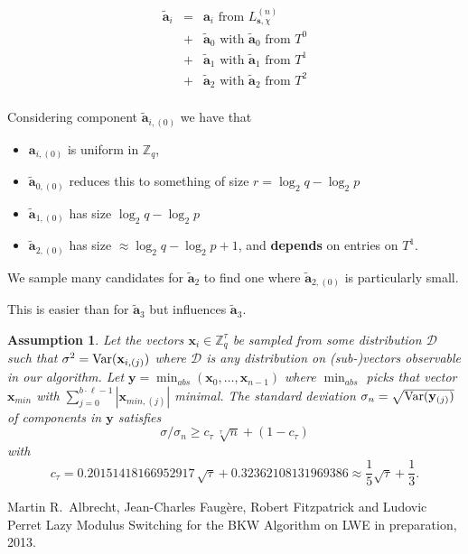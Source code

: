 \documentclass[10pt]{beamer}
\newcommand{\Var}{\ensuremath{\textnormal{Var}}}
\newcommand{\abs}[1]{\ensuremath{|#1|}\xspace}
\newcommand{\shortvec}[1]{\tilde{\mathbf{#1}}\xspace}
\renewcommand{\vec}[1]{\mathbf{#1}\xspace}
\newcommand{\Z}{\ensuremath{\mathbb{Z}}\xspace}
\newcommand{\Zq}{\ensuremath{\Z_q}\xspace}
\newcommand{\Ldis}{L_{\mathbf{s},\chi}^{(n)}\xspace}
\newtheorem{assumption}{Assumption}
\begin{document}
\begin{frame}
\begin{eqnarray*}
  \shortvec{a}_i &=& \vec{a}_i \mbox{ from } \Ldis\\
                 &+& \shortvec{a}_0 \mbox{ with } \shortvec{a}_0 \mbox{ from } T^0\\
                 &+& \shortvec{a}_1 \mbox{ with } \shortvec{a}_1 \mbox{ from } T^1\\
                 &+& \shortvec{a}_2 \mbox{ with } \shortvec{a}_2 \mbox{ from } T^2\\
\end{eqnarray*}

Considering component $\shortvec{a}_{i,(0)}$ we have that
\begin{itemize}
 \item $\vec{a}_{i,(0)}$ is uniform in $\Zq$,
 \item $\shortvec{a}_{0,(0)}$ reduces this to something of size $r  = \log_2 q - \log_2 p$
 \item $\shortvec{a}_{1,(0)}$ has size $\log_2 q - \log_2 p$
 \item $\shortvec{a}_{2,(0)}$ has size $\approx \log_2 q - \log_2 p + 1$, and \textbf{depends} on entries on $T^1$.
\end{itemize}

\framebreak

\begin{block}{}
We sample many candidates for $\shortvec{a}_{2}$ to find one where $\shortvec{a}_{2,(0)}$ is particularly small.
\end{block}

\vspace{1em}

This is easier than for $\shortvec{a}_{3}$ but influences $\shortvec{a}_3$.

\framebreak

\begin{assumption}
\label{ass:minvar}
Let the vectors $\vec{x}_i \in \Z_q^{\tau}$ be sampled from some distribution $\mathcal{D}$ such that $\sigma^2 = \Var(\vec{x}_{i,(j)})$ where $\mathcal{D}$ is any distribution on (sub-)vectors observable in our algorithm. Let $\vec{y} = \min_{abs}\left(\vec{x}_0,\dots,\vec{x}_{n-1}\right)$ where $\min_{abs}$ picks that vector $\vec{x}_{min}$ with $\sum_{j=0}^{b\cdot\ell-1} \abs{\vec{x}_{min,(j)}}$ minimal. The standard deviation $\sigma_{n} = \sqrt{\Var(\vec{y}_{(j)})}$ of components in $\vec{y}$ satisfies
$$\sigma/\sigma_n \geq c_\tau\, \sqrt[\tau]{n} + (1 - c_\tau)$$ with
$$c_\tau = 0.20151418166952917\,\sqrt{\tau}  + 0.32362108131969386\approx \frac{1}{5}\sqrt{\tau} + \frac{1}{3}.$$
\end{assumption}


\begin{thebibliography}{foobar}
Martin R.\ Albrecht, Jean-Charles Faugère, Robert Fitzpatrick and Ludovic Perret
\newblock Lazy Modulus Switching for the BKW Algorithm on LWE
\newblock in preparation, 2013.

\end{thebibliography}

\end{frame}
\end{document}
